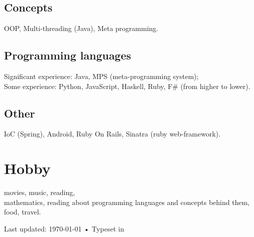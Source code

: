\documentclass[11pt, a4paper]{article}
\begin{document}
\subsection*{Concepts}
OOP, Multi-threading (Java), Meta programming.

\subsection*{Programming languages}
Significant experience: Java, MPS (meta-programming system); \\
Some experience: Python, JavaScript, Haskell, Ruby, F\# (from higher to lower).

\subsection*{Other}
IoC (Spring), Android, Ruby On Rails, Sinatra (ruby web-framework). \\[.2cm]

\section*{Hobby}

movies, music, reading, \\
mathematics, reading about programming languages and concepts behind them, \\
food, travel. \\



\vfill{}

\begin{center}
{\scriptsize  Last updated: \today\- •\-
Typeset in \href{http://nitens.org/taraborelli/cvtex}{
\XeTeX }\\
}
\end{center}
\end{document}
